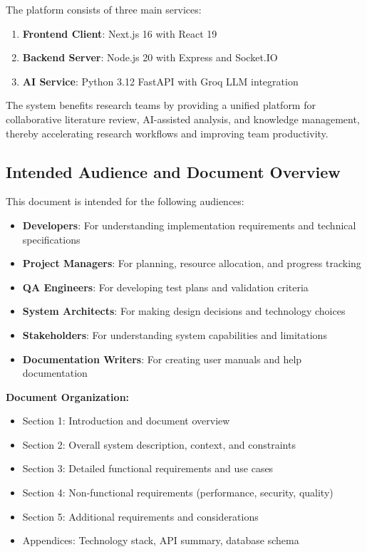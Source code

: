 \documentclass[11pt,a4paper]{article}
\begin{document}
The platform consists of three main services:
\begin{enumerate}
    \item \textbf{Frontend Client}: Next.js 16 with React 19
    \item \textbf{Backend Server}: Node.js 20 with Express and Socket.IO
    \item \textbf{AI Service}: Python 3.12 FastAPI with Groq LLM integration
\end{enumerate}

The system benefits research teams by providing a unified platform for collaborative literature review, AI-assisted analysis, and knowledge management, thereby accelerating research workflows and improving team productivity.

\subsection{Intended Audience and Document Overview}

This document is intended for the following audiences:

\begin{itemize}
    \item \textbf{Developers}: For understanding implementation requirements and technical specifications
    \item \textbf{Project Managers}: For planning, resource allocation, and progress tracking
    \item \textbf{QA Engineers}: For developing test plans and validation criteria
    \item \textbf{System Architects}: For making design decisions and technology choices
    \item \textbf{Stakeholders}: For understanding system capabilities and limitations
    \item \textbf{Documentation Writers}: For creating user manuals and help documentation
\end{itemize}

\textbf{Document Organization:}
\begin{itemize}
    \item Section 1: Introduction and document overview
    \item Section 2: Overall system description, context, and constraints
    \item Section 3: Detailed functional requirements and use cases
    \item Section 4: Non-functional requirements (performance, security, quality)
    \item Section 5: Additional requirements and considerations
    \item Appendices: Technology stack, API summary, database schema
\end{itemize}
\end{document}
